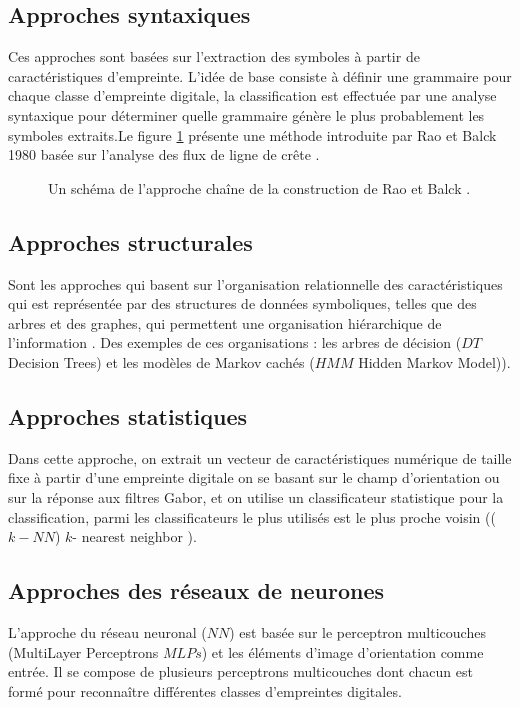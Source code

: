 	\subsection{Approches syntaxiques}
	Ces approches sont basées sur l'extraction des symboles à partir de caractéristiques d'empreinte. L’idée de base consiste à définir une grammaire pour chaque classe d'empreinte digitale, la classification est effectuée par une analyse syntaxique pour déterminer quelle grammaire génère le plus probablement les symboles extraits\citep{mridula2014review}.Le figure \ref{fig:chapitre2classificationsyntax} présente une méthode introduite par Rao et Balck 1980 basée sur l'analyse des flux de ligne de crête \citep{karu1996fingerprint}.


	\begin{center}
	\begin{figure}[H]
		\centering
		\caption{Un schéma de l'approche chaîne de la construction de Rao et Balck  \citep{karu1996fingerprint}.}
		\label{fig:chapitre2classificationsyntax}
	\end{figure}
\end{center}
	\subsection{Approches structurales}
	Sont les approches qui basent sur l'organisation relationnelle des caractéristiques qui est représentée par des structures de données symboliques, telles que des arbres et des graphes, qui permettent une organisation hiérarchique de l'information \citep{maio1996structural}. Des exemples de ces organisations : les arbres de décision ($ DT $ Decision Trees) et les modèles de Markov cachés ($ HMM $ Hidden Markov Model)).
	\subsection{Approches statistiques}
	Dans cette approche, on extrait un vecteur de caractéristiques numérique de taille fixe à partir d'une empreinte digitale on se basant sur le champ d'orientation ou sur la réponse aux filtres Gabor, et on utilise un classificateur statistique pour la classification, parmi les classificateurs le plus utilisés est le plus proche voisin (($ k-NN $) $ k $- nearest neighbor ).
	\subsection{Approches des réseaux de neurones }
	L'approche du réseau neuronal ($ NN $) est basée sur le perceptron multicouches (MultiLayer Perceptrons $ MLPs $) et les éléments d'image d'orientation comme entrée. Il se compose de plusieurs perceptrons multicouches dont chacun est formé pour reconnaître différentes classes d'empreintes digitales. 

